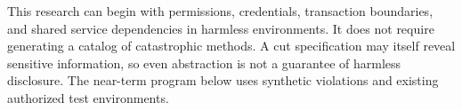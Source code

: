 This research can begin with permissions, credentials, transaction boundaries, and shared service dependencies in harmless environments. It does not require generating a catalog of catastrophic methods. A cut specification may itself reveal sensitive information, so even abstraction is not a guarantee of harmless disclosure. The near-term program below uses synthetic violations and existing authorized test environments.
